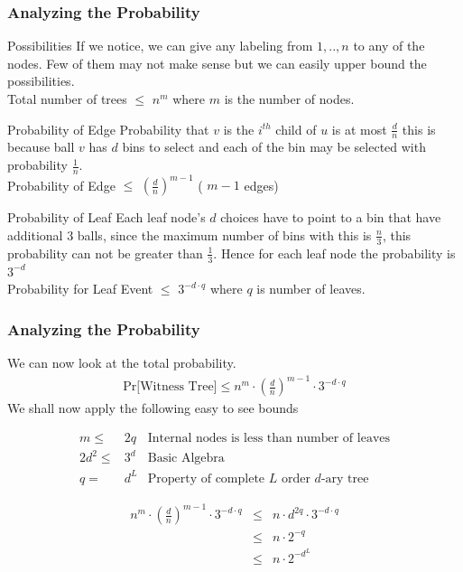 \documentclass{beamer}
\begin{document}
\begin{frame}
\frametitle{Analyzing the Probability}
\begin{block}
{Possibilities} If we notice, we can give any labeling from $1,..,n$ to any of the nodes. Few of them may not make sense but we can easily upper bound the possibilities. \\
Total number of trees $\leq$ $n^m$ where $m$ is the number of nodes. 
\end{block}
\begin{block}
{Probability of Edge} Probability that $v$ is the $i^{th}$ child of $u$ is at most $\frac{d}{n}$ this is because ball $v$ has $d$ bins to select and each of the bin may be selected with probability $\frac{1}{n}$. \\
Probability of Edge $\leq$ $\left( \frac{d}{n} \right) ^{m-1}$ ( $m-1$ edges) 
\end{block}
\begin{block}
{Probability of Leaf} Each leaf node's $d$ choices have to point to a bin that have additional $3$ balls, since the maximum number of bins with this is $\frac{n}{3}$, this probability can not be greater than $\frac{1}{3}$. Hence for each leaf node the probability is $3^{-d}$ \\
Probability for Leaf Event $\leq$ $3^{-d\cdot q}$ where $q$ is number of leaves. 
\end{block}
\end{frame}


\begin{frame}
\frametitle{Analyzing the Probability}
We can now look at the total probability.
\begin{eqnarray}
 \text{Pr[Witness Tree]} \leq n^m \cdot  \left( \frac{d}{n} \right) ^{m-1} \cdot 3^{-d\cdot q}
\end{eqnarray}
We shall now apply the following easy to see bounds 

\begin{eqnarray}
 m \leq & 2q & \text{Internal nodes is less than number of leaves} \nonumber \\
 2d^2 \leq & 3^d & \text{Basic Algebra} \nonumber \\
 q = & d^L & \text{Property of complete $L$ order $d$-ary tree} \nonumber
\end{eqnarray}

\begin{eqnarray}
 n^m \cdot  \left( \frac{d}{n} \right) ^{m-1} \cdot 3^{-d\cdot q} & \leq & n \cdot d ^{2q} \cdot 3^{-d \cdot q} \\
& \leq & n \cdot 2^{-q} \\
& \leq & n \cdot 2^{-d^L}
\end{eqnarray}

\end{frame}
\end{document}
